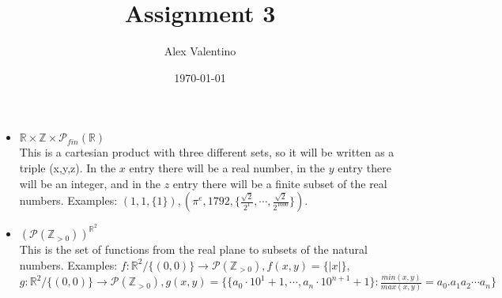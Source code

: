 \documentclass[12pt, letterpaper]{article}
\date{\today}
\author{Alex Valentino}
\title{Assignment 3}
\newcommand{\Z}{\mathbb{Z}}
\newcommand{\R}{\mathbb{R}}
\newcommand{\Po}{\mathcal{P}}
\begin{document}
	\begin{itemize}
		\item $\R \times \Z \times \Po_{fin}(\R)$\\
		This is a cartesian product with three different sets, so it will be written as a triple (x,y,z).  In the $x$ entry there will be a real number, in the $y$ entry there will be an integer, and in the $z$ entry there will be a finite subset of the real numbers.  Examples: $(1,1,\{1\}), (\pi^e,1792,\{\frac{\sqrt{2}}{2^1},\cdots,\frac{\sqrt{2}}{2^{1000}}\})$.
		\item $(\Po(\Z_{>0}))^{\R^2}$\\
		This is the set of functions from the real plane to subsets of the natural numbers.  Examples: $f:\R^2 / \{(0,0)\} \to \Po(\Z_{>0}), f(x,y) = \{|x|\}$, $g: \R^2/ \{(0,0)\} \to \Po(\Z_{>0}), g(x,y) = \{\{a_0 \cdot 10 ^ 1 + 1, \cdots, a_n \cdot 10 ^ {n+1} + 1\}: \frac{min(x,y)}{max(x,y)} = a_0.a_1 a_2 \cdots a_n\}$
	\end{itemize}
\end{document}

